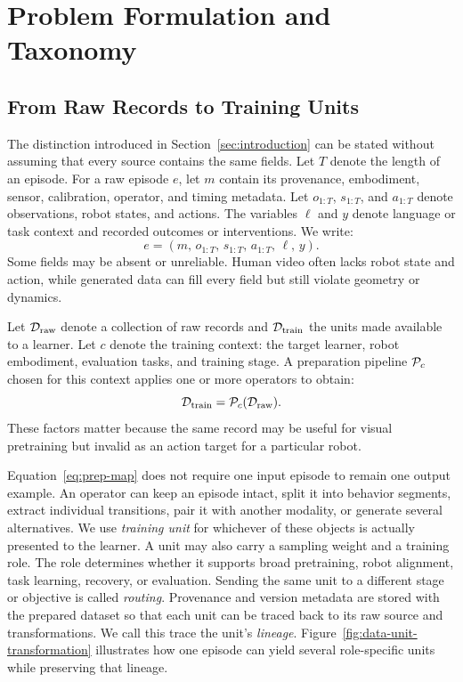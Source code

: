 \section{Problem Formulation and Taxonomy}
\label{sec:problem}

\subsection{From Raw Records to Training Units}

The distinction introduced in Section~\ref{sec:introduction} can be stated without assuming that every source contains the same fields.
Let $T$ denote the length of an episode.
For a raw episode $e$, let $m$ contain its provenance, embodiment, sensor, calibration, operator, and timing metadata.
Let $o_{1:T}$, $s_{1:T}$, and $a_{1:T}$ denote observations, robot states, and actions.
The variables $\ell$ and $y$ denote language or task context and recorded outcomes or interventions.
We write:
\begin{equation}
e=(m,\,o_{1:T},\,s_{1:T},\,a_{1:T},\,\ell,\,y).
\end{equation}
Some fields may be absent or unreliable.
Human video often lacks robot state and action, while generated data can fill every field but still violate geometry or dynamics.

Let $\mathcal{D}_{\mathrm{raw}}$ denote a collection of raw records and $\mathcal{D}_{\mathrm{train}}$ the units made available to a learner.
Let $c$ denote the training context: the target learner, robot embodiment, evaluation tasks, and training stage.
A preparation pipeline $\mathcal{P}_c$ chosen for this context applies one or more operators to obtain:
\begin{equation}
\mathcal{D}_{\mathrm{train}}=\mathcal{P}_c(\mathcal{D}_{\mathrm{raw}}).
\label{eq:prep-map}
\end{equation}
These factors matter because the same record may be useful for visual pretraining but invalid as an action target for a particular robot.

Equation~\ref{eq:prep-map} does not require one input episode to remain one output example.
An operator can keep an episode intact, split it into behavior segments, extract individual transitions, pair it with another modality, or generate several alternatives.
We use \emph{training unit} for whichever of these objects is actually presented to the learner.
A unit may also carry a sampling weight and a training role.
The role determines whether it supports broad pretraining, robot alignment, task learning, recovery, or evaluation.
Sending the same unit to a different stage or objective is called \emph{routing}.
Provenance and version metadata are stored with the prepared dataset so that each unit can be traced back to its raw source and transformations.
We call this trace the unit's \emph{lineage}.
Figure~\ref{fig:data-unit-transformation} illustrates how one episode can yield several role-specific units while preserving that lineage.

